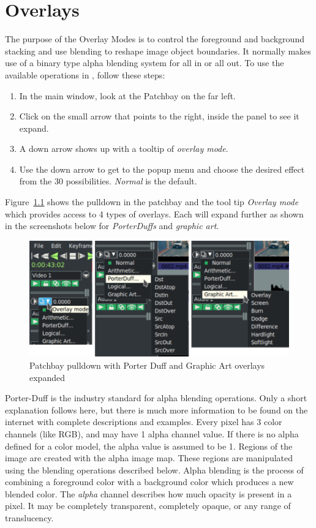 \chapter{Overlays}%
\label{cha:overlays}

The purpose of the Overlay Modes is to control the foreground and background stacking and use blending to reshape image object boundaries.  It normally makes use of a binary type alpha blending system for all in or all out.  To use the available operations in \CGG{}, follow these steps:

\begin{enumerate}
    \item In the main window, look at the Patchbay on the far left.
    \item Click on the small arrow that points to the right, inside the panel to see it expand.
    \item A down arrow shows up with a tooltip of \textit{overlay mode}.
    \item Use the down arrow to get to the popup menu and choose the desired effect from the 30 possibilities.  \textit{Normal} is the default.
\end{enumerate}

Figure~\ref{fig:overlay-01} shows the pulldown in the patchbay and the tool tip \textit{Overlay mode} which provides access to 4 types of overlays.  Each will expand further as shown in the screenshots below for \textit{PorterDuffs} and \textit{graphic art}.

\begin{figure}[htpb]
    \centering
    \includegraphics[width=0.99\linewidth]{images/overlay-01.png}
    \caption{Patchbay pulldown with Porter Duff and Graphic Art overlays expanded}
    \label{fig:overlay-01}
\end{figure}

Porter-Duff is the industry standard for alpha blending operations.  Only a short explanation follows here, but there is much more information to be found on the internet with complete descriptions and examples.  Every pixel has 3 color channels (like RGB), and may have 1 alpha channel value.  If there is no alpha defined for a color model, the alpha value is assumed to be 1.  Regions of the image are created with the alpha image map.  These regions are manipulated using the blending operations described below.  Alpha blending is the process of combining a foreground color with a background color which produces a new blended color.  The \textit{alpha} channel describes how much opacity is present in a pixel.  It may be completely transparent, completely opaque, or any range of translucency.


